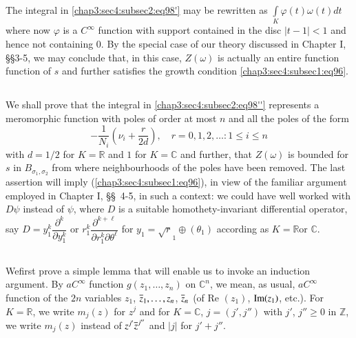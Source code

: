 The integral in \ref{chap3:sec4:subsec2:eq98'} may be rewritten as
$\int\limits_{K}\varphi(t)\omega(t)dt$ where now $\varphi$ is a
$C^{\infty}$ function with support contained in the disc $|t-1|<1$ and
hence not containing $0$. By the special case of our theory discussed
in Chapter I, \S \S 3-5, we may conclude that, in this case,
$Z(\omega)$ is actually an entire function function of $s$ and further
satisfies the growth condition \ref{chap3:sec4:subsec1:eq96}.
 
\subsection{}\label{chap3:sec4:subsec4}%

We shall prove that the integral in \ref{chap3:sec4:subsec2:eq98''}
represents a meromorphic 
function with poles of order at most $n$ and all the poles of the form
\begin{equation*}
  -\frac{1}{N_{i}}\left(\nu_{i}+\frac{r}{2d}\right),\quad
  r=0,1,2,\ldots:1\leq i\leq n\tag{99}\label{chap3:sec4:subsec4:eq99}
\end{equation*}
with $d=1/2$ for $K=\mathbb{R}$ and $1$ for $K=\mathbb{C}$ and
further, that $Z(\omega)$ is bounded for $s$ in
$B_{\sigma_{1},\sigma_{2}}$ from where neighbourhoods of the poles
have been removed. The last assertion will
imply (\ref{chap3:sec4:subsec1:eq96}), in view
of the familiar argument employed in Chapter I, \S\S\ 4-5, in such a
context: we could have well worked with $D\psi$ instead of $\psi$,
where $D$ is a suitable homothety-invariant differential operator, say
$D=y^{k}_{1}\dfrac{\partial^{k}}{\partial y^{k}_{1}}$ or
$r^{k}_{1}\dfrac{\partial^{k+\ell}}{\partial
  r^{k}_{1}\partial\theta^{\ell}}$ for $y_{1}=\sqrt{r}_{1}\oplus
(\theta_{1})$ according as $K=\mathbb{R}$or $\mathbb{C}$. 

\subsection{}\label{chap3:sec4:subsec5}%

We\pageoriginale first prove a simple lemma that will enable us to
invoke an induction argument. By $a C^{\infty}$ function
$g(z_{1},\ldots,z_{n})$ on $\mathbb{C}^{n}$, we mean, as usual,
$aC^{\infty}$ function of the $2n$ variables $z_{1}$,
$\overline{z}_{1},\ldots,z_{n}$, $\overline{z}_{n}$ (\ie of $\text{Re }(z_{1})$,
$\operatorname{Im}(z_{1})$, etc.). For $K=\mathbb{R}$, we write $m_{j}(z)$ for
$z^{j}$ and for $K=\mathbb{C}$, $j=(j',j'')$ with $j'$, $j''\geq 0$ in
$\mathbb{Z}$, we write $m_{j}(z)$ instead of $z^{j'}\overline{z}^{j''}$ and
$|j|$ for $j'+j''$.

